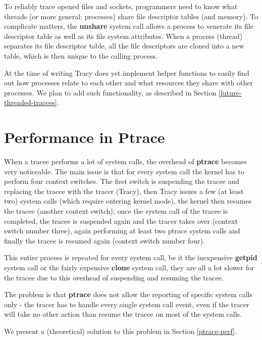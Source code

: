 \documentclass[a4paper, 10pt]{report}
\begin{document}
To reliably trace opened files and sockets, programmers need to know what
threads (or more general: processes) share file descriptor tables (and memory).
To complicate matters, the \textbf{unshare} system call allows a process to
venerate its file descriptor table as well as its file system attributes. When a
process (thread) separates its file descriptor table, all the file descriptors
are cloned into a new table, which is then unique to the calling process.

At the time of writing Tracy does yet implement helper functions to easily find
out how processes relate to each other and what resources they share with
other processes. We plan to add such functionality, as described in
Section \ref{future-threaded-tracees}.


\section{Performance in Ptrace}
\label{ptrace-perf-problems}

When a tracee performs a lot of system calls, the overhead of \textbf{ptrace}
becomes very noticeable. The main issue is that for every system call the kernel
has to perform four context switches. The first switch is suspending the tracee
and replacing the tracee with the tracer (Tracy), then Tracy issues a few
(at least two) system calls (which require entering kernel mode),
the kernel then resumes the tracee (another context switch); once the system
call of the tracee is completed, the tracee is suspended again and the tracer
takes over (context switch number three), again performing at least two ptrace
system calls and finally the tracee is resumed again (context switch number four).

This entire process is repeated for every system call, be it the
inexpensive \textbf{getpid} system call or the fairly expensive
\textbf{clone} system call, they are all a lot slower for the tracee
due to this overhead of suspending and resuming the tracee.

The problem is that \textbf{ptrace} does not allow the reporting of specific
system calls only - the tracer has to handle every single system call event,
even if the tracer will take no other action than resume the tracee on most
of the system calls.

We present a (theoretical) solution to this problem in
Section \ref{ptrace-perf}.
\end{document}
